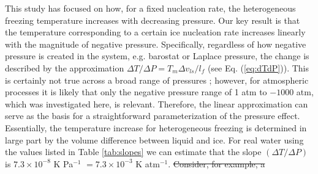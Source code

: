 \documentclass[journal abbreviation, manuscript]{copernicus}
\providecommand{\DIFdel}[1]{{\protect\color{red}\sout{#1}}}                      %
\providecommand{\DIFaddbegin}{} %
\providecommand{\DIFdelbegin}{} %
\providecommand{\DIFdelend}{} %
\begin{document}
This study has focused on how, for a fixed nucleation rate, the heterogeneous freezing temperature increases with decreasing pressure. Our key result is that the temperature corresponding to a certain ice nucleation rate increases linearly with the magnitude of negative pressure. Specifically, regardless of how negative pressure is created in the system, e.g. barostat or Laplace pressure, the change is described by the approximation $\Delta T/\Delta P = T_m \Delta v_{ls} / l_f$ (see Eq. (\ref{eq:dTdP})). This is certainly not true across a broad range of pressures \citep[e.g.,][]{bianco2021, espinosa2016}; however, for atmospheric processes it is likely that only the negative pressure range of 1 atm to $-1000$ atm, which was investigated here, is relevant. Therefore, the linear approximation can serve as the basis for a straightforward parameterization of the pressure effect. Essentially, the temperature increase for heterogeneous freezing is determined in large part by the volume difference between liquid and ice. For real water using the values listed in Table \ref{tab:slopes} we can estimate that the slope $(\Delta T/\Delta P)$ is $7.3 \times 10^{-8}$ K Pa$^{-1}$ $= 7.3 \times 10^{-3}$ K atm$^{-1}$. 
\DIFdelbegin \DIFdel{Consider, for example, a }\DIFdelend \DIFaddbegin 
\end{document}
